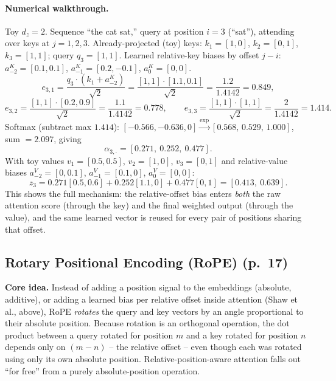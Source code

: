 \documentclass[11pt]{article}
\begin{document}
\paragraph{Numerical walkthrough.} Toy $d_z=2$. Sequence ``the cat sat,'' query at position $i=3$ (``sat''), attending over keys at $j=1,2,3$. Already-projected (toy) keys: $k_1=[1,0]$, $k_2=[0,1]$, $k_3=[1,1]$; query $q_3=[1,1]$. Learned relative-key biases by offset $j-i$: $a^K_{-2}=[0.1,0.1]$, $a^K_{-1}=[0.2,-0.1]$, $a^K_{0}=[0,0]$.
\[
e_{3,1} = \frac{q_3\cdot(k_1+a^K_{-2})}{\sqrt2} = \frac{[1,1]\cdot[1.1,0.1]}{\sqrt2} = \frac{1.2}{1.4142} = 0.849,
\]
\[
e_{3,2} = \frac{[1,1]\cdot[0.2,0.9]}{\sqrt2} = \frac{1.1}{1.4142} = 0.778, \qquad
e_{3,3} = \frac{[1,1]\cdot[1,1]}{\sqrt2} = \frac{2}{1.4142} = 1.414.
\]
Softmax (subtract max $1.414$): $[-0.566,-0.636,0] \xrightarrow{\exp} [0.568,\,0.529,\,1.000]$, sum $=2.097$, giving
\[
\alpha_{3,\cdot} = [0.271,\ 0.252,\ 0.477].
\]
With toy values $v_1=[0.5,0.5]$, $v_2=[1,0]$, $v_3=[0,1]$ and relative-value biases $a^V_{-2}=[0,0.1]$, $a^V_{-1}=[0.1,0]$, $a^V_0=[0,0]$:
\[
z_3 = 0.271[0.5,0.6] + 0.252[1.1,0] + 0.477[0,1] = [0.413,\ 0.639].
\]
This shows the full mechanism: the relative-offset bias enters \emph{both} the raw attention score (through the key) and the final weighted output (through the value), and the same learned vector is reused for every pair of positions sharing that offset.

\subsection{Rotary Positional Encoding (RoPE) (p.\ 17)}

\textbf{Core idea.} Instead of adding a position signal to the embeddings (absolute, additive), or adding a learned bias per relative offset inside attention (Shaw et al., above), RoPE \emph{rotates} the query and key vectors by an angle proportional to their absolute position. Because rotation is an orthogonal operation, the dot product between a query rotated for position $m$ and a key rotated for position $n$ depends only on $(m-n)$ -- the relative offset -- even though each was rotated using only its own absolute position. Relative-position-aware attention falls out ``for free'' from a purely absolute-position operation.
\end{document}
